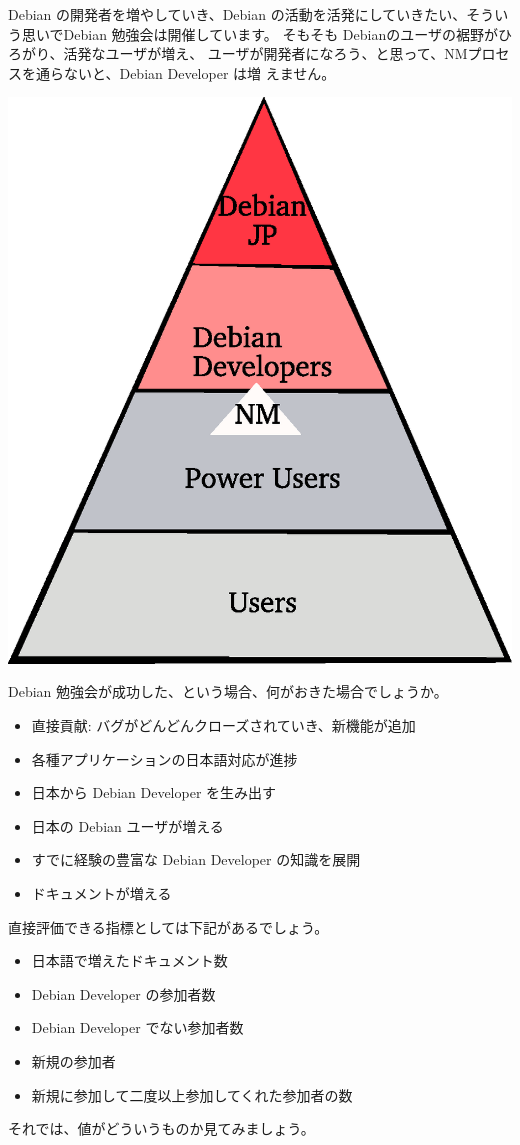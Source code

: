 \documentclass[mingoth,a4paper]{jsarticle}
\begin{document}
Debian の開発者を増やしていき、Debian の活動を活発にしていきたい、そうい
う思いでDebian 勉強会は開催しています。
そもそも Debianのユーザの裾野がひろがり、活発なユーザが増え、
ユーザが開発者になろう、と思って、NMプロセスを通らないと、Debian Developer は増
えません。

\includegraphics[width=0.5\hsize]{image200612/hierarchy.eps}

Debian 勉強会が成功した、という場合、何がおきた場合でしょうか。

\begin{itemize}
 \item 直接貢献: バグがどんどんクローズされていき、新機能が追加
 \item 各種アプリケーションの日本語対応が進捗
 \item 日本から Debian Developer を生み出す
 \item 日本の Debian ユーザが増える
 \item すでに経験の豊富な Debian Developer の知識を展開
 \item ドキュメントが増える
\end{itemize}

直接評価できる指標としては下記があるでしょう。

\begin{itemize}
 \item 日本語で増えたドキュメント数
 \item Debian Developer の参加者数
 \item Debian Developer でない参加者数
 \item 新規の参加者
 \item 新規に参加して二度以上参加してくれた参加者の数
\end{itemize}

それでは、値がどういうものか見てみましょう。
\end{document}
